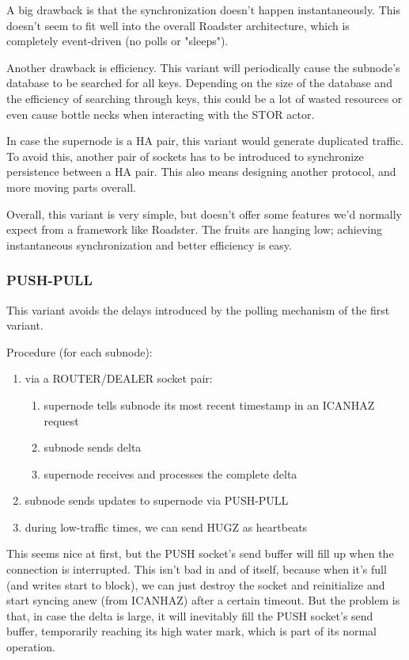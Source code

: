 A big drawback is that the synchronization doesn't happen instantaneously. This
doesn't seem to fit well into the overall Roadster architecture, which is
completely event-driven (no polls or "sleeps").

Another drawback is efficiency. This variant will periodically cause the
subnode's database to be searched for all keys. Depending on the size of the
database and the efficiency of searching through keys, this could be a lot of
wasted resources or even cause bottle necks when interacting with the STOR
actor.

In case the supernode is a HA pair, this variant would generate duplicated
traffic. To avoid this, another pair of sockets has to be introduced to
synchronize persistence between a HA pair. This also means designing another
protocol, and more moving parts overall.


Overall, this variant is very simple, but doesn't offer some features we'd
normally expect from a framework like Roadster. The fruits are hanging low;
achieving instantaneous synchronization and better efficiency is easy.

\subsubsection{PUSH-PULL}
This variant avoids the delays introduced by the polling mechanism of the first variant.

Procedure (for each subnode):
\begin{enumerate}
	\item via a ROUTER/DEALER socket pair:
		\begin{enumerate}
			\item supernode tells subnode its most recent timestamp in an ICANHAZ request
			\item subnode sends delta
			\item supernode receives and processes the complete delta
		\end{enumerate}
	\item subnode sends updates to supernode via PUSH-PULL
	\item during low-traffic times, we can send HUGZ as heartbeats
\end{enumerate}

This seems nice at first, but the PUSH socket's send buffer will fill up when the
connection is interrupted.  This isn't bad in and of itself, because when it's
full (and writes start to block), we can just destroy the socket and
reinitialize and start syncing anew (from ICANHAZ) after a certain timeout.
But the problem is that, in case the delta is large, it will inevitably fill
the PUSH socket's send buffer, temporarily reaching its high water mark, which
is part of its normal operation.

